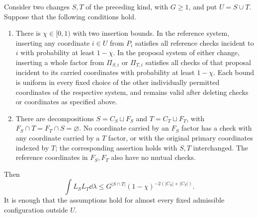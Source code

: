\begin{lemma}\label{lem:cancellation}
Consider two changes $S,T$ of the preceding kind, with $G\ge1$, and put
$U=S\cup T$. Suppose that the following conditions hold.
\begin{enumerate}
 \item[(i)] There is $\chi\in[0,1)$ with two insertion bounds.
 In the reference system, inserting any coordinate $i\in U$ from $P_i$
 satisfies all reference checks incident to $i$ with probability at least
 $1-\chi$. In the proposal system of either change, inserting a whole
 factor from $\Pi_{S,i}$ or $\Pi_{T,i}$ satisfies all checks of that
 proposal incident to its carried coordinates with probability at least
 $1-\chi$. Each bound is uniform in every fixed choice of the other
 individually permitted coordinates of the respective system, and remains
 valid after deleting checks or coordinates as specified above.
 \item[(ii)] There are decompositions $S=C_S\sqcup F_S$ and
 $T=C_T\sqcup F_T$, with $F_S\cap T=F_T\cap S=\varnothing$.
 No coordinate carried by an $F_S$ factor has a check with any coordinate
 carried by a $T$ factor, or with the original primary coordinates indexed
 by $T$; the corresponding assertion holds with $S,T$ interchanged.
 The reference coordinates in $F_S,F_T$ also have no mutual checks.
\end{enumerate}
Then
\begin{equation}\label{cmp:cancellation-bound}
 \int L_SL_T\dd\lambda
 \le G^{|S\cap T|}(1-\chi)^{-2(|C_S|+|C_T|)}.
\end{equation}
It is enough that the assumptions hold for almost every fixed admissible
configuration outside $U$.
\end{lemma}

